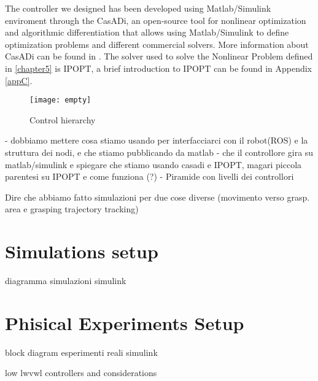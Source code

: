 The controller we designed has been developed using Matlab/Simulink enviroment through the CasADi, an open-source tool for nonlinear optimization and algorithmic differentiation that allows using Matlab/Simulink to define optimization problems and different commercial solvers. More information about CasADi can be found in \cite{Andersson2018}. The solver used to solve the Nonlinear Problem defined in \ref{chapter5} is IPOPT, a brief introduction to IPOPT can be found in Appendix \ref{appC}.

\begin{figure}[htbp]
	\begin{center} 
		\texttt{[image: empty]}
		\centering
		\label{Hierpir}
		\caption{Control hierarchy} 
	\end{center}
\end{figure}


- dobbiamo mettere cosa stiamo usando per interfacciarci con il robot(ROS) e la struttura dei nodi, e che stiamo pubblicando da matlab
- che il controllore gira su matlab/simulink e spiegare che stiamo usando casadi e IPOPT, magari piccola parentesi su IPOPT e come funziona (?)
- Piramide con livelli dei controllori

Dire che abbiamo fatto simulazioni per due cose diverse (movimento verso grasp. area e grasping trajectory tracking)

\section{Simulations setup}

	diagramma simulazioni simulink
	
\section{Phisical Experiments Setup}
	
	block diagram esperimenti reali simulink

	low lwvwl controllers and considerations
